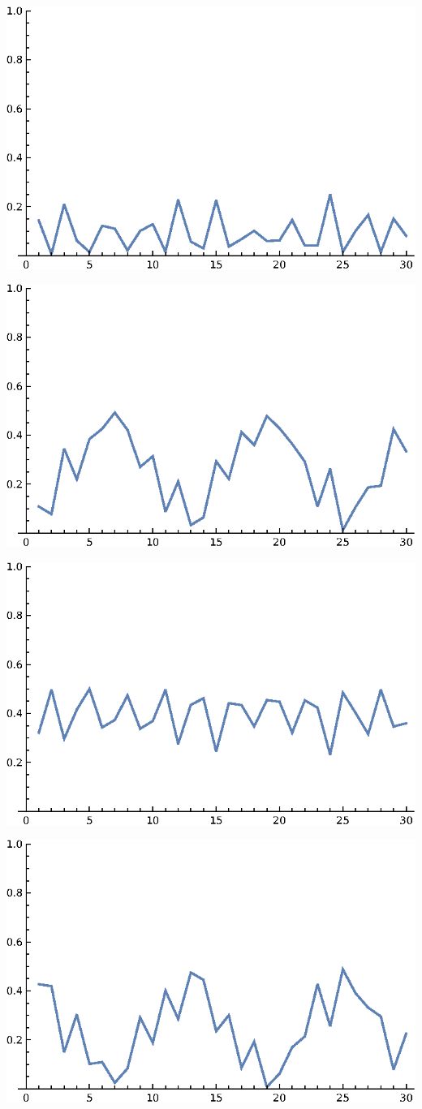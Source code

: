\documentclass{article}
\begin{document}
\includegraphics{PageRank_gr5.eps}

\includegraphics{PageRank_gr6.eps}

\includegraphics{PageRank_gr7.eps}

\includegraphics{PageRank_gr8.eps}
\end{document}
